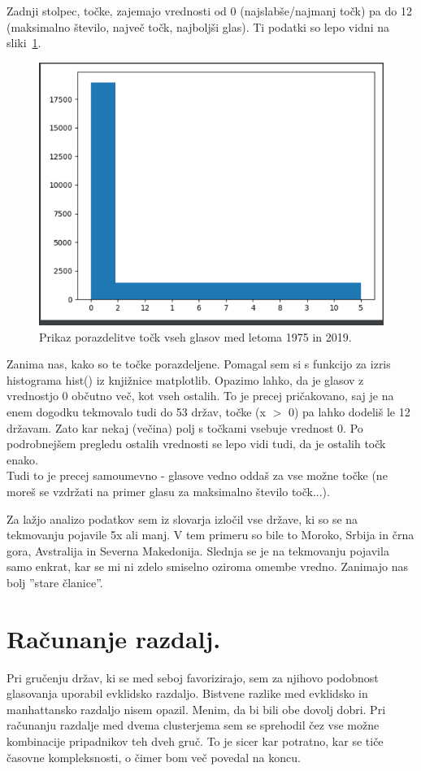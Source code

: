 \documentclass[a4paper,11pt]{article}
\begin{document}
Zadnji stolpec, točke, zajemajo vrednosti od 0 (najslabše/najmanj točk) pa do 12 (maksimalno število, največ točk, najboljši glas).
Ti podatki so lepo vidni na sliki~\ref{slika1}.
\begin{figure}[h!]
\begin{center}
\includegraphics[scale=0.45]{zero-values-votes.png}
\caption{Prikaz porazdelitve točk vseh glasov med letoma 1975 in 2019.}
\label{slika1}
\end{center}
\end{figure}

Zanima nas, kako so te točke porazdeljene. Pomagal sem si s funkcijo za izris histograma hist() iz knjižnice matplotlib.
Opazimo lahko, da je glasov z vrednostjo 0 občutno več, kot vseh ostalih. To je precej pričakovano, saj je na enem dogodku
tekmovalo tudi do 53 držav, točke (x $>$ 0) pa lahko dodeliš le 12 državam. Zato kar nekaj (večina) polj s točkami vsebuje vrednost 0.
Po podrobnejšem pregledu ostalih vrednosti se lepo vidi tudi, da je ostalih točk enako.
\\Tudi to je precej samoumevno -
glasove vedno oddaš za vse možne točke (ne moreš se vzdržati na primer glasu za maksimalno število točk...).

Za lažjo analizo podatkov sem iz slovarja izločil vse države, ki so se na tekmovanju pojavile 5x ali manj. V tem primeru so bile
to Moroko, Srbija in črna gora, Avstralija in Severna Makedonija. Slednja se je na tekmovanju pojavila samo enkrat, kar se
mi ni zdelo smiselno oziroma omembe vredno. Zanimajo nas bolj ''stare članice''.

\section{Računanje razdalj.}
Pri gručenju držav, ki se med seboj favorizirajo, sem za njihovo podobnost glasovanja uporabil evklidsko razdaljo.
Bistvene razlike med evklidsko in manhattansko razdaljo nisem opazil. Menim, da bi bili obe dovolj dobri.
Pri računanju razdalje med dvema clusterjema sem se sprehodil čez vse možne kombinacije pripadnikov teh dveh gruč.
To je sicer kar potratno, kar se tiče časovne kompleksnosti, o čimer bom več povedal na koncu.
\end{document}
